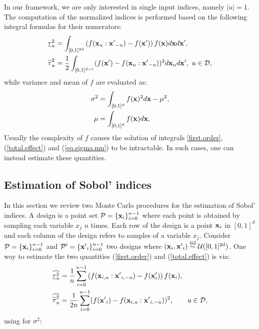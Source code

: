 In our framework, we are only interested in single input indices, namely $|u|=1$. The computation of the normalized indices is performed based on the following integral formulas for their numerators:
\begin{align}
\label{first.order}
\underline{\tau}_u^2  &= \int_{[0,1]^{2d}} \left(
f(\vx_u:{\vx'}_{-u})-f(\vx')\right)f(\vx)d\vx d{\vx'}, \\
\label{total.effect}
\ov{$\tau$}_u^2 &= \frac{1}{2}\int_{[0,1]^{d+1}}(f(\vx')-f(\vx_u:{\vx'}_{-u}))^2 d\vx_u d{\vx'}, \ u \in \mathcal{D},
\end{align}
while variance and mean of $f$ are evaluated as:
\begin{gather}
\begin{aligned}
\sigma^2 &= \int_{[0,1]^{d}} f(\boldsymbol{\mathbf{x}})^2d{\boldsymbol{\mathbf{x}}} - \mu^2, \\
 \mu &= \int_{[0,1]^{d}} f(\boldsymbol{\mathbf{x}}) d{\boldsymbol{\mathbf{x}}},
\label{eq.sigma.mu}
\end{aligned}
\end{gather}
Usually the complexity of $f$ causes the solution of integrals \eqref{first.order}, (\ref{total.effect}) and (\ref{eq.sigma.mu}) to be intractable. In such cases, one can instead estimate these quantities.

\subsection{Estimation of Sobol' indices}
\label{sec:2.2}
In this section we review two Monte Carlo procedures for the estimation of Sobol' indices. A design is a point set $\mathcal{P}=\{\boldsymbol{\mathbf{x}}_i\}_{i=0}^{n-1}$ where each point is obtained by sampling each variable $x_j$ $n$ times. Each row of the design is a point $\boldsymbol{\mathbf{x}}_i$ in $[0,1]^d$ and each column of the design refers to samples of a variable $x_j$. Consider $\mathcal{P}=\{\boldsymbol{\mathbf{x}}_i\}_{i=0}^{n-1}$ and $\mathcal{P'}=\{{\boldsymbol{\mathbf{x}}'}_i\}_{i=0}^{n-1}$ two designs where $(\boldsymbol{\mathbf{x}}_i,{\boldsymbol{\mathbf{x}}'}_i) \stackrel{{\rm iid}}{\sim} \mathcal{U}([0,1]^{2d})$. One way to estimate the two quantities (\ref{first.order}) and (\ref{total.effect}) is via:
\begin{align}
\label{first.order.est}
\widehat{\underline{\tau}_u^2} &= \frac{1}{n} \sum \limits_{i=0}^{n-1} \left(f(\vx_{i,u}:{\vx'}_{i,-u})-f(\vx'_i)\right)f(\vx_i),\\
\label{total.effect.est}
\widehat{\ov{$\tau$}_u^2} &= \frac{1}{2n} \sum \limits_{i=0}^{n-1} (f({\vx'}_i) - f(\vx_{i,u}:{\vx'}_{i,-u}))^2, \qquad u \in \mathcal{D},
\end{align}
using for $\sigma^2$:

